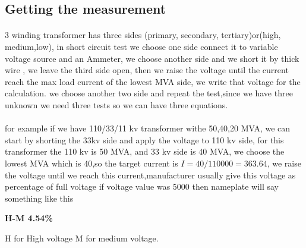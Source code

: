 \documentclass[]{article}
\begin{document}
\subsection{Getting the measurement}
\paragraph{}3 winding transformer has three sides (primary, secondary, tertiary)or(high, medium,low), in short circuit test we choose one side connect it to variable voltage source and an Ammeter, we choose another side and we short it by thick wire , we leave the third side open, then we raise the voltage until the current reach the max load current  of the lowest MVA side, we write that voltage for the calculation. we choose another two side and repeat the test,since we have three unknown we need three tests so we can have three equations.
\paragraph{}for example if we have 110/33/11 kv transformer withe 50,40,20 MVA, we can start by
shorting the 33kv side and apply the voltage to 110 kv side, for this transformer the 110 kv is 50 MVA, and 33 kv side is 40 MVA, we choose the lowest MVA which is 40,so the target current is $I=40/110000=363.64$, we raise the voltage until we reach this current,manufacturer usually give this voltage as percentage of full voltage if voltage value was 5000 then nameplate will say something like this
\begin{center}
	\textbf{H-M 4.54\%}
\end{center}
H for High voltage M for medium voltage.
\end{document}
